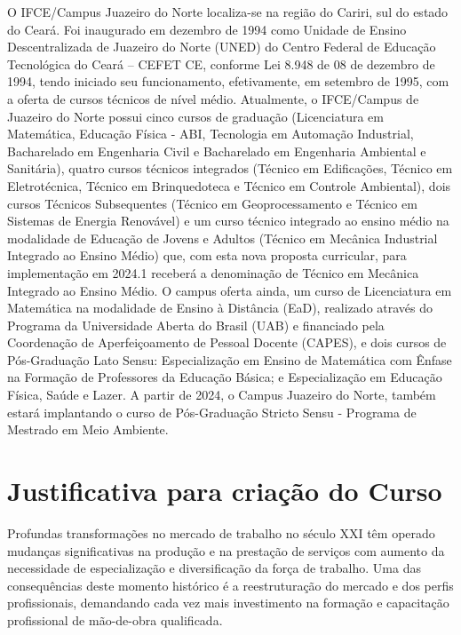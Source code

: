 O IFCE/Campus Juazeiro do Norte localiza-se na região do Cariri, sul do estado do Ceará. Foi inaugurado em dezembro de 1994 como Unidade de Ensino Descentralizada de Juazeiro do Norte (UNED) do Centro Federal de Educação Tecnológica do Ceará – CEFET CE, conforme Lei 8.948 de 08 de dezembro de 1994, tendo iniciado seu funcionamento, efetivamente, em setembro de 1995, com a oferta de cursos técnicos de nível médio. Atualmente, o IFCE/Campus de Juazeiro do Norte possui cinco cursos de graduação (Licenciatura em Matemática, Educação Física - ABI, Tecnologia em Automação Industrial, Bacharelado em Engenharia Civil e Bacharelado em Engenharia Ambiental e Sanitária), quatro cursos técnicos integrados (Técnico em Edificações, Técnico em Eletrotécnica, Técnico em Brinquedoteca e Técnico em Controle Ambiental), dois cursos Técnicos Subsequentes (Técnico em Geoprocessamento e Técnico em Sistemas de Energia Renovável) e um curso técnico integrado ao ensino médio na modalidade de Educação de Jovens e Adultos (Técnico em Mecânica Industrial Integrado ao Ensino Médio) que, com esta nova proposta curricular, para implementação em 2024.1 receberá a denominação de Técnico em Mecânica Integrado ao Ensino Médio. O campus oferta ainda, um curso de Licenciatura em Matemática na modalidade de Ensino à Distância (EaD), realizado através do Programa da Universidade Aberta do Brasil (UAB) e financiado pela Coordenação de Aperfeiçoamento de Pessoal Docente (CAPES), e dois cursos de Pós-Graduação Lato Sensu: Especialização em Ensino de Matemática com Ênfase na Formação de Professores da Educação Básica; e Especialização em Educação Física, Saúde e Lazer. A partir de 2024, o Campus Juazeiro do Norte, também estará implantando o curso de Pós-Graduação Stricto Sensu - Programa de Mestrado em Meio Ambiente.

\chapter{Justificativa para criação do Curso}

Profundas transformações no mercado de trabalho no século XXI têm operado mudanças significativas na produção e na prestação de serviços com aumento da necessidade de especialização e diversificação da força de trabalho. Uma das consequências deste momento histórico é a reestruturação do mercado e dos perfis profissionais, demandando cada vez mais investimento na formação e capacitação profissional de mão-de-obra qualificada.\\

